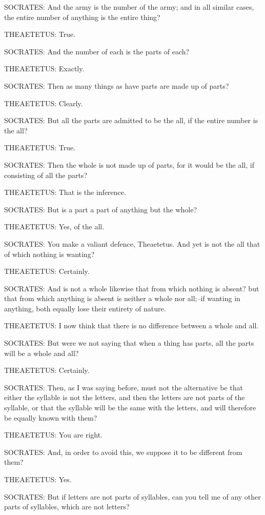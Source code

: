SOCRATES: And the army is the number of the army; and in all similar
cases, the entire number of anything is the entire thing?

THEAETETUS: True.

SOCRATES: And the number of each is the parts of each?

THEAETETUS: Exactly.

SOCRATES: Then as many things as have parts are made up of parts?

THEAETETUS: Clearly.

SOCRATES: But all the parts are admitted to be the all, if the entire
number is the all?

THEAETETUS: True.

SOCRATES: Then the whole is not made up of parts, for it would be the
all, if consisting of all the parts?

THEAETETUS: That is the inference.

SOCRATES: But is a part a part of anything but the whole?

THEAETETUS: Yes, of the all.

SOCRATES: You make a valiant defence, Theaetetus. And yet is not the all
that of which nothing is wanting?

THEAETETUS: Certainly.

SOCRATES: And is not a whole likewise that from which nothing is absent?
but that from which anything is absent is neither a whole nor all;--if
wanting in anything, both equally lose their entirety of nature.

THEAETETUS: I now think that there is no difference between a whole and
all.

SOCRATES: But were we not saying that when a thing has parts, all the
parts will be a whole and all?

THEAETETUS: Certainly.

SOCRATES: Then, as I was saying before, must not the alternative be that
either the syllable is not the letters, and then the letters are not
parts of the syllable, or that the syllable will be the same with the
letters, and will therefore be equally known with them?

THEAETETUS: You are right.

SOCRATES: And, in order to avoid this, we suppose it to be different
from them?

THEAETETUS: Yes.

SOCRATES: But if letters are not parts of syllables, can you tell me of
any other parts of syllables, which are not letters?


